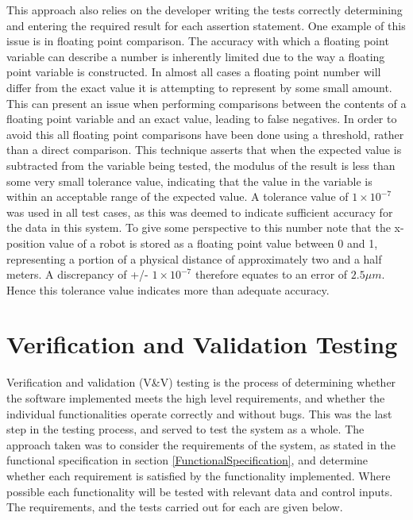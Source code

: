 This approach also relies on the developer writing the tests correctly determining and entering the required result for each assertion statement. One example of this issue is in floating point comparison. The accuracy with which a floating point variable can describe a number is inherently limited due to the way a floating point variable is constructed. In almost all cases a floating point number will differ from the exact value it is attempting to represent by some small amount. This can present an issue when performing comparisons between the contents of a floating point variable and an exact value, leading to false negatives. In order to avoid this all floating point comparisons have been done using a threshold, rather than a direct comparison. This technique asserts that when the expected value is subtracted from the variable being tested, the modulus of the result is less than some very small tolerance value, indicating that the value in the variable is within an acceptable range of the expected value. A tolerance value of $ 1 \times 10^{-7} $ was used in all test cases, as this was deemed to indicate sufficient accuracy for the data in this system. To give some perspective to this number note that the x-position value of a robot is stored as a floating point value between 0 and 1, representing a portion of a physical distance of approximately two and a half meters. A discrepancy of +/- $  1 \times 10^{-7} $ therefore equates to an error of $ 2.5 \mu m $. Hence this tolerance value indicates more than adequate accuracy.


\section{Verification and Validation Testing} \label{ValidationTesting}
Verification and validation (V\&V) testing is the process of determining whether the software implemented meets the high level requirements, and whether the individual functionalities operate correctly and without bugs. This was the last step in the testing process, and served to test the system as a whole. The approach taken was to consider the requirements of the system, as stated in the functional specification in section \ref{FunctionalSpecification}, and determine whether each requirement is satisfied by the functionality implemented. Where possible each functionality will be tested with relevant data and control inputs. The requirements, and the tests carried out for each are given below.

